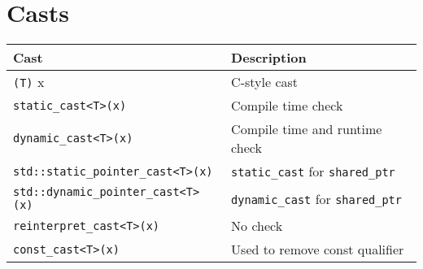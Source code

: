 \section{Casts}

\begin{center}
  \begin{tabular}{ll}
    \textbf{Cast} & \textbf{Description} \\
    \toprule
    \verb'(T)' x & C-style cast \\
    \verb'static_cast<T>(x)' & Compile time check \\
    \verb'dynamic_cast<T>(x)' & Compile time and runtime check \\
    \verb'std::static_pointer_cast<T>(x)' & \verb'static_cast' for \verb'shared_ptr' \\
    \verb'std::dynamic_pointer_cast<T>(x)' & \verb'dynamic_cast' for \verb'shared_ptr' \\
    \verb'reinterpret_cast<T>(x)' & No check \\
    \verb'const_cast<T>(x)' & Used to remove const qualifier \\
    \bottomrule
  \end{tabular}
\end{center}


